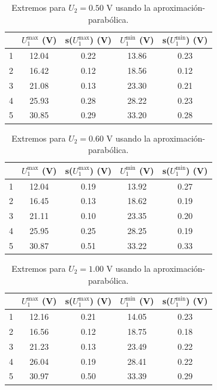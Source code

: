 \documentclass[12pt,a4paper]{article}
\numberwithin{equation}{section}
\numberwithin{figure}{section}
\begin{document}
 
\begin{table}[h!] 	 \centering 
\begin{tabular}{ccccc}
\hline & $U_1^{\max}$ (V) & s($U_1^{\max}$) (V) & $U_1^{\min}$ (V) & s($U_1^{\min}$) (V) \\
\hline
 1 & 12.04 & 0.22 & 13.86 & 0.23 \\
 2 & 16.42 & 0.12 & 18.56 & 0.12 \\
 3 & 21.08 & 0.13 & 23.30 & 0.21 \\
 4 & 25.93 & 0.28 & 28.22 & 0.23 \\
 5 & 30.85 & 0.29 & 33.20 & 0.28 \\
\hline
\end{tabular}\caption{Extremos para $U_2=0.50$ V usando la aproximación-parabólica.} 
\label{Tab:parabolas-2} 
\end{table} 
 
 
\begin{table}[h!] 	 \centering 
\begin{tabular}{ccccc}
\hline & $U_1^{\max}$ (V) & s($U_1^{\max}$) (V) & $U_1^{\min}$ (V) & s($U_1^{\min}$) (V) \\
\hline
 1 & 12.04 & 0.19 & 13.92 & 0.27 \\
 2 & 16.45 & 0.13 & 18.62 & 0.19 \\
 3 & 21.11 & 0.10 & 23.35 & 0.20 \\
 4 & 25.95 & 0.25 & 28.25 & 0.19 \\
 5 & 30.87 & 0.51 & 33.22 & 0.33 \\
\hline
\end{tabular}\caption{Extremos para $U_2=0.60$ V usando la aproximación-parabólica.} 
\label{Tab:parabolas-3} 
\end{table} 

\newpage 
 
\begin{table}[h!] 	 \centering 
\begin{tabular}{ccccc}
\hline & $U_1^{\max}$ (V) & s($U_1^{\max}$) (V) & $U_1^{\min}$ (V) & s($U_1^{\min}$) (V) \\
\hline
 1 & 12.16 & 0.21 & 14.05 & 0.23 \\
 2 & 16.56 & 0.12 & 18.75 & 0.18 \\
 3 & 21.23 & 0.13 & 23.49 & 0.22 \\
 4 & 26.04 & 0.19 & 28.41 & 0.22 \\
 5 & 30.97 & 0.50 & 33.39 & 0.29 \\
\hline
\end{tabular}\caption{Extremos para $U_2=1.00$ V usando la aproximación-parabólica.} 
\label{Tab:parabolas-4} 
\end{table} 
 
\end{document}
